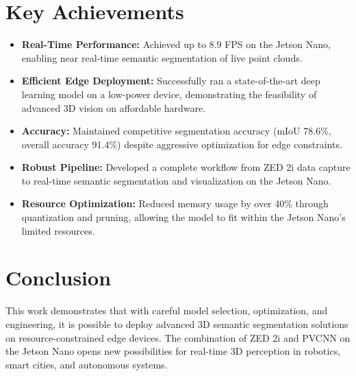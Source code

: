 \documentclass[12pt,a4paper]{article}
\begin{document}
\section*{Key Achievements}
\begin{itemize}
    \item \textbf{Real-Time Performance:} Achieved up to 8.9 FPS on the Jetson Nano, enabling near real-time semantic segmentation of live point clouds.
    \item \textbf{Efficient Edge Deployment:} Successfully ran a state-of-the-art deep learning model on a low-power device, demonstrating the feasibility of advanced 3D vision on affordable hardware.
    \item \textbf{Accuracy:} Maintained competitive segmentation accuracy (mIoU 78.6\%, overall accuracy 91.4\%) despite aggressive optimization for edge constraints.
    \item \textbf{Robust Pipeline:} Developed a complete workflow from ZED 2i data capture to real-time semantic segmentation and visualization on the Jetson Nano.
    \item \textbf{Resource Optimization:} Reduced memory usage by over 40\% through quantization and pruning, allowing the model to fit within the Jetson Nano’s limited resources.
\end{itemize}

\section*{Conclusion}
This work demonstrates that with careful model selection, optimization, and engineering, it is possible to deploy advanced 3D semantic segmentation solutions on resource-constrained edge devices. The combination of ZED 2i and PVCNN on the Jetson Nano opens new possibilities for real-time 3D perception in robotics, smart cities, and autonomous systems.
\end{document}
